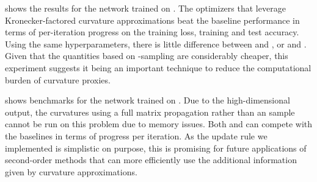  shows the results for the \CIFARTENNET network
trained on . The optimizers that leverage Kronecker-factored curvature
approximations beat the baseline performance in terms of per-iteration progress
on the training loss, training and test accuracy. Using the same
hyperparameters, there is little difference between \KFAC and \KFLR, or \DiagGGN
and \DiagGGNMC. Given that the quantities based on \MC-sampling are considerably
cheaper, this experiment suggests it being an important technique to reduce
the computational burden of curvature proxies.

 shows benchmarks for the \ALLCNNC network trained
on . Due to the high-dimensional output, the curvatures using a full
matrix propagation rather than an \MC sample cannot be run on this problem due
to memory issues. Both \DiagGGNMC and \KFAC can compete with the baselines in
terms of progress per iteration. As the update rule we implemented is simplistic
on purpose, this is promising for future applications of second-order methods
that can more efficiently use the additional information given by curvature
approximations.

